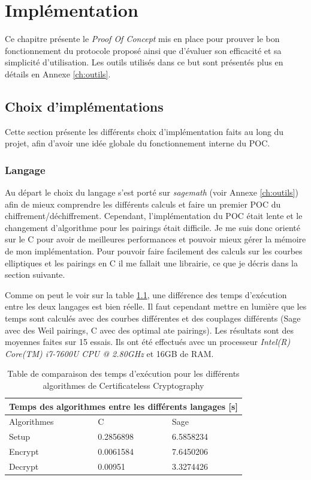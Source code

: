 \chapter{Implémentation}
\label{ch:impl}
Ce chapitre présente le \textit{Proof Of Concept} mis en place pour prouver le bon fonctionnement du protocole proposé ainsi que d'évaluer son efficacité et sa simplicité d'utilisation. Les outils utilisés dans ce but sont présentés plus en détails en Annexe \ref{ch:outils}.
\section{Choix d'implémentations}
Cette section présente les différents choix d'implémentation faits au long du projet, afin d'avoir une idée globale du fonctionnement interne du POC.
\subsection{Langage}
Au départ le choix du langage s'est porté sur \textit{sagemath} (voir Annexe \ref{ch:outils}) afin de mieux comprendre les différents calculs et faire un premier POC du chiffrement/déchiffrement.
Cependant, l'implémentation du POC était lente et le changement d'algorithme pour les pairings était difficile.
Je me suis donc orienté sur le C pour avoir de meilleures performances et pouvoir mieux gérer la mémoire de mon implémentation. Pour pouvoir faire facilement des calculs sur les courbes elliptiques et les pairings en C il me fallait une librairie, ce que je décris dans la section suivante.

Comme on peut le voir sur la table \ref{table:comparisonTimeAlgo}, une différence des temps d'exécution entre les deux langages est bien réelle. Il faut cependant mettre en lumière que les temps sont calculés avec des courbes différentes et des couplages différents (Sage avec des Weil pairings, C avec des optimal ate pairings). Les résultats sont des moyennes faites sur 15 essais. Ils ont été effectués avec un processeur \textit{Intel(R) Core(TM) i7-7600U CPU @ 2.80GHz} et 16GB de RAM.

\begin{table}[h!]
	\centering
	\begin{tabular}{ |p{3cm}||p{3cm}|p{3cm}| }
		\hline
		\multicolumn{3}{|c|}{Temps des algorithmes entre les différents langages [s]} \\
		\hline
		Algorithmes & C & Sage\\
		\hline
		Setup   & 0.2856898 & 6.5858234\\
		Encrypt & 0.0061584 & 7.6450206\\
		Decrypt & 0.00951 & 3.3274426\\
		\hline
	\end{tabular}
\caption{Table de comparaison des temps d'exécution pour les différents algorithmes de Certificateless Cryptography }
\label{table:comparisonTimeAlgo}
\end{table}

